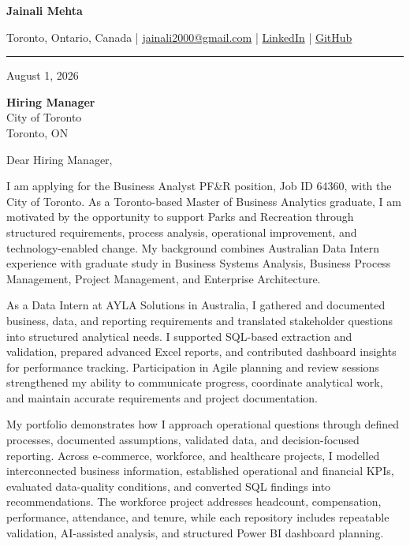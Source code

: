 \documentclass[letterpaper,10pt]{article}
\begin{document}
\begin{center}
  {\fontsize{17}{19}\selectfont\textbf{Jainali Mehta}}\par\vspace{2pt}
  \small Toronto, Ontario, Canada \;|\;
  \href{mailto:jainali2000@gmail.com}{jainali2000@gmail.com} \;|\;
  \href{https://www.linkedin.com/in/jainali-mehta}{LinkedIn} \;|\;
  \href{https://github.com/jainalimehta}{GitHub}
\end{center}
\vspace{-5pt}
\noindent\rule{\textwidth}{0.4pt}

August 1, 2026

\textbf{Hiring Manager}\\
City of Toronto\\
Toronto, ON

Dear Hiring Manager,

I am applying for the Business Analyst PF\&R position, Job ID 64360, with the City of Toronto. As a Toronto-based Master of Business Analytics graduate, I am motivated by the opportunity to support Parks and Recreation through structured requirements, process analysis, operational improvement, and technology-enabled change. My background combines Australian Data Intern experience with graduate study in Business Systems Analysis, Business Process Management, Project Management, and Enterprise Architecture.

As a Data Intern at AYLA Solutions in Australia, I gathered and documented business, data, and reporting requirements and translated stakeholder questions into structured analytical needs. I supported SQL-based extraction and validation, prepared advanced Excel reports, and contributed dashboard insights for performance tracking. Participation in Agile planning and review sessions strengthened my ability to communicate progress, coordinate analytical work, and maintain accurate requirements and project documentation.

My portfolio demonstrates how I approach operational questions through defined processes, documented assumptions, validated data, and decision-focused reporting. Across e-commerce, workforce, and healthcare projects, I modelled interconnected business information, established operational and financial KPIs, evaluated data-quality conditions, and converted SQL findings into recommendations. The workforce project addresses headcount, compensation, performance, attendance, and tenure, while each repository includes repeatable validation, AI-assisted analysis, and structured Power BI dashboard planning.
\end{document}
